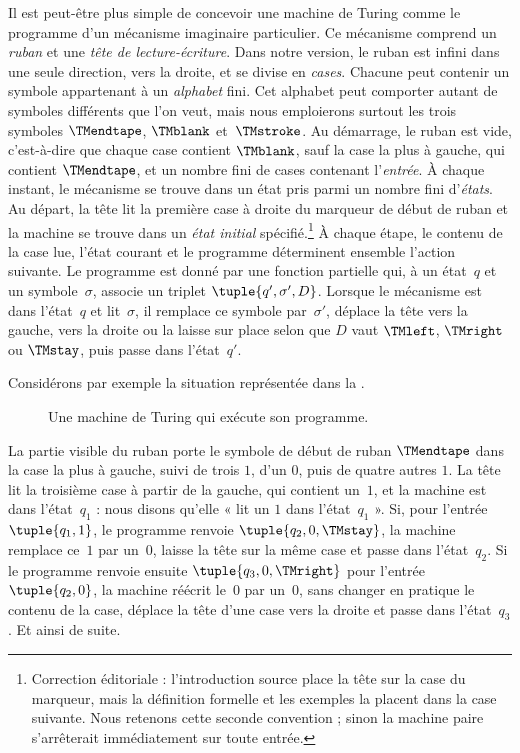 \documentclass[../../../include/open-logic-section]{subfiles}
\begin{document}
\begin{explain}
Il est peut-être plus simple de concevoir une
machine de Turing comme le programme d'un mécanisme
imaginaire particulier. Ce mécanisme comprend un
\emph{ruban} et une \emph{tête de lecture-écriture}.
Dans notre version, le ruban est infini dans une
seule direction, vers la droite, et se divise en
\emph{cases}. Chacune peut contenir un symbole
appartenant à un \emph{alphabet} fini. Cet alphabet
peut comporter autant de symboles différents que
l'on veut, mais nous emploierons surtout les trois
symboles $\TMendtape$, $\TMblank$ et~$\TMstroke$.
Au démarrage, le ruban est vide, c'est-à-dire que
chaque case contient $\TMblank$, sauf la case la
plus à gauche, qui contient $\TMendtape$, et un
nombre fini de cases contenant l'\emph{entrée}.
À chaque instant, le mécanisme se trouve dans un
état pris parmi un nombre fini d'\emph{états}. Au départ, la tête
lit la première case à droite du marqueur de début
de ruban et la machine se trouve
dans un \emph{état initial} spécifié.\footnote{Correction éditoriale : l'introduction source place la tête sur la case du marqueur, mais la définition formelle et les exemples la placent dans la case suivante. Nous retenons cette seconde convention ; sinon la machine paire s'arrêterait immédiatement sur toute entrée.} À chaque étape,
le contenu de la case lue, l'état courant et le
programme déterminent ensemble l'action suivante.
Le programme est donné par une fonction partielle
qui, à un état~$q$ et un symbole~$\sigma$, associe
un triplet $\tuple{q', \sigma', D}$. Lorsque le
mécanisme est dans l'état~$q$ et lit~$\sigma$,
il remplace ce symbole par~$\sigma'$, déplace la
tête vers la gauche, vers la droite ou la laisse
sur place selon que $D$ vaut $\TMleft$, $\TMright$
ou $\TMstay$, puis passe dans l'état~$q'$.

Considérons par exemple la situation représentée
dans la .
\begin{figure}
  \caption{Une machine de Turing qui exécute son programme.}
\end{figure}
La partie visible du ruban porte le symbole de
début de ruban $\TMendtape$ dans la case la plus
à gauche, suivi de trois $1$, d'un $0$, puis de
quatre autres $1$. La tête lit la troisième case
à partir de la gauche, qui contient un~$1$, et
la machine est dans l'état~$q_1$ : nous disons
qu'elle « lit un $1$ dans l'état~$q_1$ ».
Si, pour l'entrée $\tuple{q_1,1}$, le programme
renvoie $\tuple{q_2,0,\TMstay}$, la machine
remplace ce~$1$ par un~$0$, laisse la tête sur
la même case et passe dans l'état~$q_2$.
Si le programme renvoie ensuite
$\tuple{q_3,0,\TMright}$ pour l'entrée
$\tuple{q_2,0}$, la machine réécrit le~$0$ par
un~$0$, sans changer en pratique le contenu de
la case, déplace la tête d'une case vers la
droite et passe dans l'état~$q_3$. Et ainsi
de suite.


\end{explain}
\end{document}
